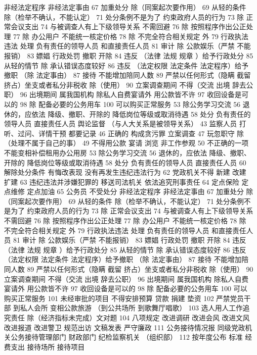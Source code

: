 \documentclass[cyan]{elegantnote}
\begin{document}
非经法定程序
非经法定事由
67 加重处分
除（同案起次要作用）
69 从轻的条件
除（检举不确认，不能认定）
71 处分条例不是为了
约束政府人员的行为
73 除 正常会议支出
74 与被调查人有上下级领导关系 不需回避
76 除 按照程序作出公正处理
77 除 办公用户
不能统一核定价格
78 除 不完全符合相关规定 外
79 行政执法违法 处理
负有责任的领导人员
和直接责任人员
81 审计
除 公款娱乐（严禁 不能报销）
83 嫖娼 行政处罚
撤职 开除
84 违反 （法律 法规 规章 ）给予行政处分
85 从轻的情节
除 承认错误态度较好
86 违反 （法定权限 法定条件 法定程序）给予撤职
（除 法定事由）
87 接待 不能增加陪同人数
89 严禁以任何形式（隐瞒 截留 挤占）坐支或者私分非税收
除（使用）
90 立案调查期间 不得（交流 出境 辞去公职）
96 出境期间 属我国机构 除私人自费宴请外 用公款皆不许
97 收回设备是可以的
98 除 配备必要的公务用车
100 可以购买正常服务
53 除公务学习交流
56 退休的，应依法
降级、撤职、开除的 降低岗位等级或取消待遇
58 处分
负有责任的领导人员
直接责任人员 舆论监督
（与人大关系是被领导关系）
43 监察人员
打听、过问、详情干预 都要记录
46 正确的
构成贪污罪
立案调查
47 玩忽职守
除（处理不属于自己的事）
49 不得用公款
宴请 浏览 非工作参观
50 不正确的一项
不能变相补偿租用办公用房
53 除公务学习交流
56 退休的，应依法
降级、撤职、开除的 降低岗位等级或取消待遇
58 处分
负有责任的领导人员
直接责任人员
60 解除处分条件
有悔改表现
没有再发生违纪违法行为
62 党政机关不得
新建 改建 扩建
63 违纪违法并涉嫌犯罪的
移送司法机关
依法追究刑事责任
64 定点保险 定点维修 定点加油
65 公务员 不受处分
非经法定程序
非经法定事由
67 加重处分
除（同案起次要作用）
69 从轻的条件
除（检举不确认，不能认定）
71 处分条例不是为了
约束政府人员的行为
73 除 正常会议支出
74 与被调查人有上下级领导关系 不需回避
76 除 按照程序作出公正处理
77 除 办公用户
不能统一核定价格
78 除 不完全符合相关规定 外
79 行政执法违法 处理
负有责任的领导人员
和直接责任人员
81 审计
除 公款娱乐（严禁 不能报销）
83 嫖娼 行政处罚
撤职 开除
84 违反 （法律 法规 规章 ）给予行政处分
85 从轻的情节
除 承认错误态度较好
86 违反 （法定权限 法定条件 法定程序）给予撤职
（除 法定事由）
87 接待 不能增加陪同人数
89 严禁以任何形式（隐瞒 截留 挤占）坐支或者私分非税收
除（使用）
90 立案调查期间 不得（交流 出境 辞去公职）
96 出境期间 属我国机构 除私人自费宴请外 用公款皆不许
97 收回设备是可以的
98 除 配备必要的公务用车
100 可以购买正常服务
101 未经审批的项目
不得安排预算 贷款 捐建 垫资
102 严禁党员干部
到私人会所 变相公款旅游
（到公共场所 到歌舞厅唱歌）
103 选人用人工作追究责任
除（经济指标未完成）文对题
104 八项规定
改进调研 改进会风
改进文风 改进报道
改进警卫 规范出访
文稿发表 严守廉政
111 公务接待情况报
同级党政机关公务接待管理部门
财政部门
纪检监察机关
（组织部）
112 按年度公布
标准 经费支出 接待场所 接待项目
\end{document}
